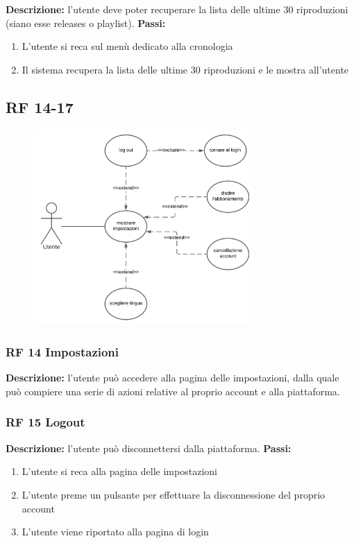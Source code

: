 \documentclass[a4paper,12pt]{article}
\begin{document}
\textbf{Descrizione:} l’utente deve poter recuperare la lista delle ultime 30 riproduzioni (siano esse releases o playlist). \newline
\textbf{Passi:}
\begin{enumerate}
    \item L’utente si reca sul menù dedicato alla cronologia
    \item Il sistema recupera la lista delle ultime 30 riproduzioni e le mostra all’utente
\end{enumerate}

\subsection*{RF 14-17}

\begin{figure}[htp]
    \centering
    \includegraphics[width=0.75\textwidth]{diagrams/use-case-14-15-16-17-18.png}
\end{figure}

\subsubsection*{RF 14 Impostazioni}

\textbf{Descrizione:} l’utente può accedere alla pagina delle impostazioni, dalla quale può compiere una serie di azioni relative al proprio account e alla piattaforma.

\subsubsection*{RF 15 Logout}

\textbf{Descrizione:} l’utente può disconnettersi dalla piattaforma. \newline
\textbf{Passi:}
\begin{enumerate}
    \item L’utente si reca alla pagina delle impostazioni
    \item L’utente preme un pulsante per effettuare la disconnessione del proprio account
    \item L’utente viene riportato alla pagina di login
\end{enumerate}
\end{document}
